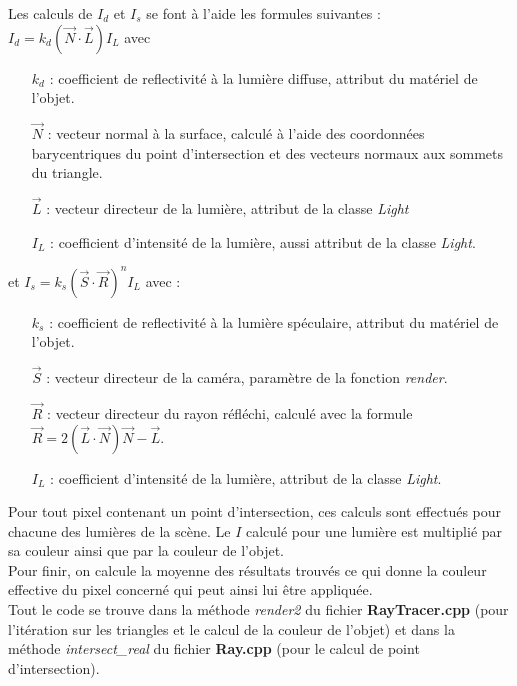 \documentclass[a4paper,11pt,titlepage]{article}
\begin{document}
Les calculs de $I_d$ et $I_s$ se font à l'aide les formules suivantes : \\
$I_d = k_d(\vec N \cdot \vec L)I_L$ avec 
\begin{itemize}
 \item[$k_d$ :] coefficient de reflectivité à la lumière diffuse, attribut du matériel de l'objet.
 \item[$\vec N$ :] vecteur normal à la surface, calculé à l'aide des coordonnées barycentriques du point d'intersection et des vecteurs normaux aux sommets du triangle.
 \item[$\vec L$ :] vecteur directeur de la lumière, attribut de la classe \textit{Light}
 \item[$I_L$ :] coefficient d'intensité de la lumière, aussi attribut de la classe \textit{Light}.\\
\end{itemize}
et $I_s = k_s(\vec S \cdot \vec R)^nI_L$ avec : 
\begin{itemize}
 \item[$k_s$ :] coefficient de reflectivité à la lumière spéculaire, attribut du matériel de l'objet.
 \item[$\vec S$ :] vecteur directeur de la caméra, paramètre de la fonction \textit{render}.
 \item[$\vec R$ :] vecteur directeur du rayon réfléchi, calculé avec la formule\\ $\vec R = 2(\vec L \cdot \vec N)\vec N - \vec L$.
 \item[$I_L$ :] coefficient d'intensité de la lumière, attribut de la classe \textit{Light}.\\
\end{itemize}


Pour tout pixel contenant un point d'intersection, ces calculs sont effectués pour chacune des lumières de la scène. Le $I$ calculé pour une lumière est multiplié par sa couleur ainsi que par la couleur de l'objet.\\
Pour finir, on calcule la moyenne des résultats trouvés ce qui donne la couleur effective du pixel concerné qui peut ainsi lui être appliquée.\\

Tout le code se trouve dans la méthode \textit{render2} du fichier \textbf{RayTracer.cpp} (pour l'itération sur les triangles et le calcul de la couleur de l'objet) et dans la méthode \textit{intersect\_real} du fichier \textbf{Ray.cpp} (pour le calcul de point d'intersection).

\newpage
\end{document}
